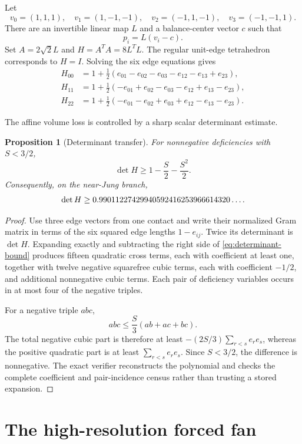 \documentclass[11pt,reqno]{amsart}
\newtheorem{proposition}[theorem]{Proposition}
\theoremstyle{remark}
\begin{document}
Let
\[
 v_0=(1,1,1),\quad v_1=(1,-1,-1),\quad
 v_2=(-1,1,-1),\quad v_3=(-1,-1,1).
\]
There are an invertible linear map $L$ and a balance-center vector $c$ such
that
\[
 p_i=L(v_i-c).
\]
Set $A=2\sqrt2L$ and $H=A^TA=8L^TL$.  The regular unit-edge tetrahedron
corresponds to $H=I$.  Solving the six edge equations gives
\begin{align}
 H_{00}&=1+\tfrac12(e_{01}-e_{02}-e_{03}-e_{12}-e_{13}+e_{23}),\label{eq:h00}\\
 H_{11}&=1+\tfrac12(-e_{01}+e_{02}-e_{03}-e_{12}+e_{13}-e_{23}),\label{eq:h11}\\
 H_{22}&=1+\tfrac12(-e_{01}-e_{02}+e_{03}+e_{12}-e_{13}-e_{23}).\label{eq:h22}
\end{align}

The affine volume loss is controlled by a sharp scalar determinant estimate.

\begin{proposition}[Determinant transfer]\label{prop:determinant}
For nonnegative deficiencies with $S<3/2$,
\begin{equation}\label{eq:determinant-bound}
 \det H\ge1-\frac S2-\frac{S^2}{2}.
\end{equation}
Consequently, on the near-Jung branch,
\[
 \det H\ge0.99011227429940592416253966614320\ldots.
\]
\end{proposition}

\begin{proof}
Use three edge vectors from one contact and write their normalized Gram matrix
in terms of the six squared edge lengths $1-e_{ij}$.  Twice its determinant is
$\det H$.  Expanding exactly and subtracting the right side of
\eqref{eq:determinant-bound} produces fifteen quadratic cross terms, each with
coefficient at least one, together with twelve negative squarefree cubic terms,
each with coefficient $-1/2$, and additional nonnegative cubic terms.  Each
pair of deficiency variables occurs in at most four of the negative triples.

For a negative triple $abc$,
\[
 abc\le\frac{S}{3}(ab+ac+bc).
\]
The total negative cubic part is therefore at least
$-(2S/3)\sum_{r<s}e_re_s$, whereas the positive quadratic part is at least
$\sum_{r<s}e_re_s$.  Since $S<3/2$, the difference is nonnegative.  The exact
verifier reconstructs the polynomial and checks the complete coefficient and
pair-incidence census rather than trusting a stored expansion.
\end{proof}

\section{The high-resolution forced fan}
\label{sec:fan}
\end{document}
